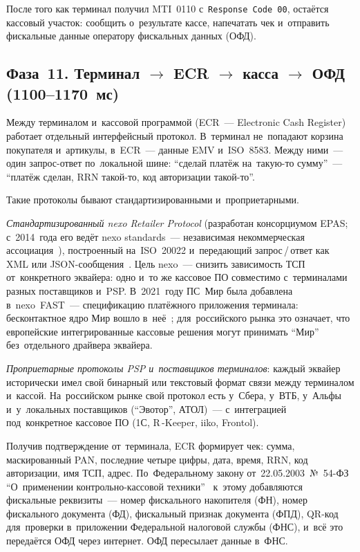 После того как терминал получил MTI~0110 с~\texttt{Response~Code~00}, остаётся
кассовый участок: сообщить о~результате кассе, напечатать чек и~отправить
фискальные данные оператору фискальных данных (ОФД).

\subsection*{Фаза~11. Терминал \ensuremath{\rightarrow} ECR \ensuremath{\rightarrow} касса \ensuremath{\rightarrow} ОФД (1100--1170~мс)}

Между терминалом и~кассовой программой (ECR~--- Electronic Cash Register)
работает отдельный интерфейсный протокол. В~терминал не~попадают корзина
покупателя и~артикулы, в~ECR~--- данные EMV и~ISO~8583. Между ними~---
один запрос-ответ по~локальной шине: \enquote{сделай платёж на~такую-то сумму}~---
\enquote{платёж сделан, RRN такой-то, код авторизации такой-то}.

Такие протоколы бывают стандартизированными и~проприетарными.

\emph{Стандартизированный nexo Retailer Protocol} (разработан консорциумом
  EPAS; с~2014~года его ведёт nexo standards~--- независимая некоммерческая
ассоциация~\cite{nexo-about-us}),
построенный на~ISO~20022 и~передающий запрос\,/\,ответ как XML или
JSON-сообщения~\cite{nexo-retailer-protocol}. Цель nexo~--- снизить зависимость
ТСП от~конкретного эквайера: одно и~то же кассовое ПО совместимо с~терминалами
разных поставщиков и~PSP. В~2021~году ПС~Мир была добавлена
в~nexo~FAST~--- спецификацию платёжного приложения терминала: бесконтактное
ядро Мир вошло в~неё~\cite{nexo-mir-fast-2022};
для~российского рынка это означает, что европейские интегрированные кассовые
решения могут принимать \enquote{Мир} без~отдельного драйвера эквайера.

\emph{Проприетарные протоколы PSP и~поставщиков терминалов}: каждый эквайер
исторически имел свой бинарный или текстовый формат связи между терминалом
и~кассой. На~российском рынке свой протокол есть у~Сбера, у~ВТБ, у~Альфы
и~у~локальных поставщиков (\enquote{Эвотор}, АТОЛ)~--- с~интеграцией под~конкретное кассовое ПО
(1С, R\,-Keeper, iiko, Frontol).

Получив подтверждение от~терминала, ECR формирует чек:
сумма, маскированный PAN, последние четыре цифры, дата, время, RRN, код
авторизации, имя ТСП, адрес. По~Федеральному закону от~22.05.2003~№~54-ФЗ
\enquote{О~применении контрольно-кассовой техники}~\cite{fz-54} к~этому
добавляются фискальные реквизиты~--- номер фискального накопителя (ФН), номер
фискального документа (ФД), фискальный признак документа (ФПД), QR-код для~проверки
в~приложении Федеральной налоговой службы (ФНС), и~всё это передаётся ОФД через
интернет. ОФД пересылает данные в~ФНС.

